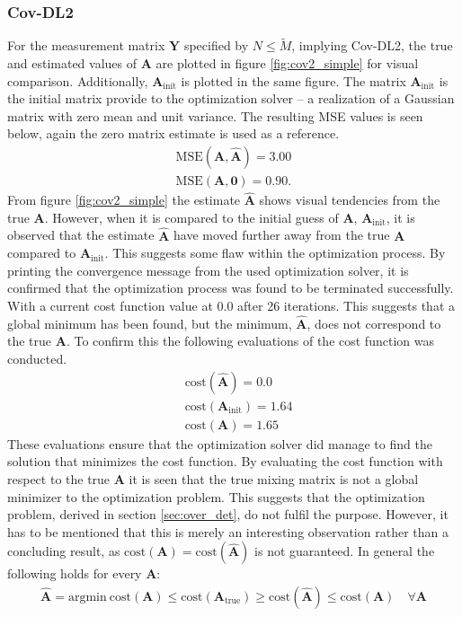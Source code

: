 \subsubsection{Cov-DL2}
For the measurement matrix $\mathbf{Y}$ specified by $N \leq \widetilde{M}$, implying Cov-DL2, the true and estimated values of $\mathbf{A}$ are plotted in figure \ref{fig:cov2_simple} for visual comparison. 
Additionally, $\mathbf{A}_{\text{init}}$ is plotted in the same figure. 
The matrix $\mathbf{A}_{\text{init}}$ is the initial matrix provide to the optimization solver -- a realization of a Gaussian matrix with zero mean and unit variance. 
The resulting MSE values is seen below, again the zero matrix estimate is used as a reference. 
\begin{align*}
\text{MSE}(\mathbf{A}, \hat{\mathbf{A}}) = 3.00 \\
\text{MSE}(\mathbf{A}, \mathbf{0}) = 0.90.
\end{align*}
From figure \ref{fig:cov2_simple} the estimate $\hat{\mathbf{A}}$ shows visual tendencies from the true $\mathbf{A}$. 
However, when it is compared to the initial guess of $\mathbf{A}$, $\mathbf{A}_{\text{init}}$, it is observed that the estimate $\hat{\mathbf{A}}$ have moved further away from the true $\mathbf{A}$ compared to $\mathbf{A}_{\text{init}}$. 
This suggests some flaw within the optimization process. 
By printing the convergence message from the used optimization solver, it is confirmed that the optimization process was found to be terminated successfully. 
With a current cost function value at $0.0$ after 26 iterations. 
This suggests that a global minimum has been found, but the minimum, $\hat{\mathbf{A}}$, does not correspond to the true $\mathbf{A}$. 
To confirm this the following evaluations of the cost function was conducted. 
\begin{align*}
&\text{cost}(\hat{\mathbf{A}}) = 0.0\\
&\text{cost}(\mathbf{A}_{\text{init}}) = 1.64\\
&\text{cost}(\mathbf{A}) = 1.65
\end{align*}
These evaluations ensure that the optimization solver did manage to find the solution that minimizes the cost function. 
By evaluating the cost function with respect to the true $\mathbf{A}$ it is seen that the true mixing matrix is not a global minimizer to the optimization problem. 
This suggests that the optimization problem, derived in section \ref{sec:over_det}, do not fulfil the purpose.
However, it has to be mentioned that this is merely an interesting observation rather than a concluding result, as $\text{cost}(\mathbf{A}) = \text{cost}(\hat{\mathbf{A}})$ is not guaranteed. 
In general the following holds for every $\mathbf{A}$:
\begin{align*}
\hat{\mathbf{A}} = \text{argmin}\  \text{cost}(\mathbf{A}) \leq \text{cost}(\mathbf{A}_{\text{true}}) \geq \text{cost}(\hat{\mathbf{A}}) \leq \text{cost}(\mathbf{A})\quad \forall \mathbf{A} 
\end{align*}  

